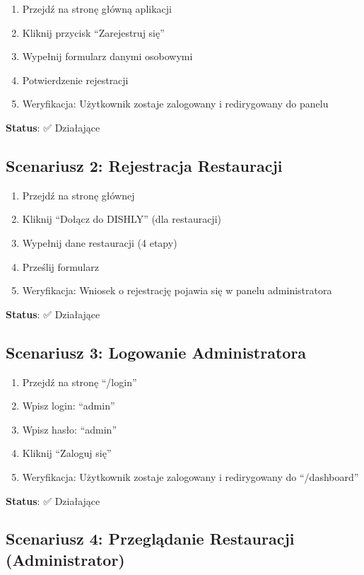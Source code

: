 \documentclass[12pt,a4paper,utf-8]{article}
\begin{document}
\begin{enumerate}
    \item Przejdź na stronę główną aplikacji
    \item Kliknij przycisk ``Zarejestruj się''
    \item Wypełnij formularz danymi osobowymi
    \item Potwierdzenie rejestracji
    \item Weryfikacja: Użytkownik zostaje zalogowany i redirygowany do panelu
\end{enumerate}

\textbf{Status}: ✅ Działające

\subsection{Scenariusz 2: Rejestracja Restauracji}

\begin{enumerate}
    \item Przejdź na stronę głównej
    \item Kliknij ``Dołącz do DISHLY'' (dla restauracji)
    \item Wypełnij dane restauracji (4 etapy)
    \item Prześlij formularz
    \item Weryfikacja: Wniosek o rejestrację pojawia się w panelu administratora
\end{enumerate}

\textbf{Status}: ✅ Działające

\subsection{Scenariusz 3: Logowanie Administratora}

\begin{enumerate}
    \item Przejdź na stronę ``/login''
    \item Wpisz login: ``admin''
    \item Wpisz hasło: ``admin''
    \item Kliknij ``Zaloguj się''
    \item Weryfikacja: Użytkownik zostaje zalogowany i redirygowany do ``/dashboard''
\end{enumerate}

\textbf{Status}: ✅ Działające

\subsection{Scenariusz 4: Przeglądanie Restauracji (Administrator)}
\end{document}
